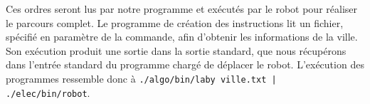 \hspace{1cm}

\noindent Ces ordres seront lus par notre programme et exécutés par le robot pour réaliser le parcours complet. Le programme de création des instructions lit un fichier, spécifié en paramètre de la commande, afin d'obtenir les informations de la ville. Son exécution produit une sortie dans la sortie standard, que nous récupérons dans l'entrée standard du programme chargé de déplacer le robot. L'exécution des programmes ressemble donc à \texttt{./algo/bin/laby ville.txt | ./elec/bin/robot}.